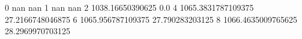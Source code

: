 0 nan nan
1 nan nan
2 1038.16650390625 0.0
4 1065.3831787109375 27.2166748046875
6 1065.956787109375 27.790283203125
8 1066.4635009765625 28.2969970703125
